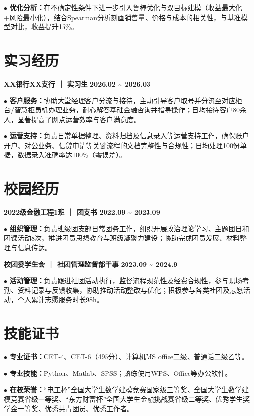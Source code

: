 \documentclass[11pt,a4paper,fontset=none]{ctexart}
\newcommand{\daterange}[1]{{\textbf{#1}}}
\newcommand{\entrytitle}[1]{{\textbf{#1}}}
\begin{document}
\par\noindent
$\bullet$ \textbf{优化分析：}在不确定性条件下进一步引入鲁棒优化与双目标建模（收益最大化+风险最小化），结合Spearman分析刻画销售量、价格与成本的相关性，与基准模型对比，收益提升15\%。

\section*{实习经历}
\vspace{-0.1em}

\noindent
\entrytitle{XX银行XX支行 ｜ 实习生}
\hfill \daterange{2026.02 \textasciitilde{} 2026.03}

\par\noindent
$\bullet$ \textbf{客户服务：}协助大堂经理客户分流与接待，主动引导客户取号并分流至对应柜台/智慧柜员机办理业务，耐心解答基础金融咨询并指导操作；日均接待客户80余人，显著提高了网点运营效率与客户满意度。
\par\noindent
$\bullet$ \textbf{运营支持：}负责日常单据整理、资料归档及信息录入等运营支持工作，确保账户开户、对公业务、信贷申请等关键流程的文档完整性与合规性；日均处理100份单据，数据录入准确率达100\%（零误差）。

\section*{校园经历}
\vspace{-0.1em}

\noindent
\entrytitle{2022级金融工程1班 ｜ 团支书}
\hfill \daterange{2022.09 \textasciitilde{} 2023.09}

\par\noindent
$\bullet$ \textbf{组织管理：}负责班级团支部日常团务工作，组织开展政治理论学习、主题团日和团课活动8次，推进团员思想教育与班级凝聚力建设；协助完成团员发展、材料整理与信息传达。

\noindent
\entrytitle{校团委学生会 ｜ 社团管理监督部干事}
\hfill \daterange{2023.09 \textasciitilde{} 2024.9}

\par\noindent
$\bullet$ \textbf{活动管理：}负责跟进社团活动执行，监督流程规范性及经费合规性，参与现场考勤、资料记录与反馈收集，协助推动活动整改与优化；积极参与各类社团及志愿活动，个人累计志愿服务时长98h。

\section*{技能证书}
\vspace{-0.1em}
\noindent $\bullet$ \textbf{专业证书：}CET-4、CET-6（495分）、计算机MS office二级、普通话二级乙等。

\noindent $\bullet$ \textbf{专业技能：}Python、Matlab、SPSS；熟练使用WPS、Office等办公软件。

\noindent $\bullet$ \textbf{在校荣誉：}“电工杯”全国大学生数学建模竞赛国家级三等奖、全国大学生数学建模竞赛省级一等奖、“东方财富杯”全国大学生金融挑战赛省级二等奖、优秀学生奖学金一等奖、优秀共青团员、优秀工作者。
\end{document}
